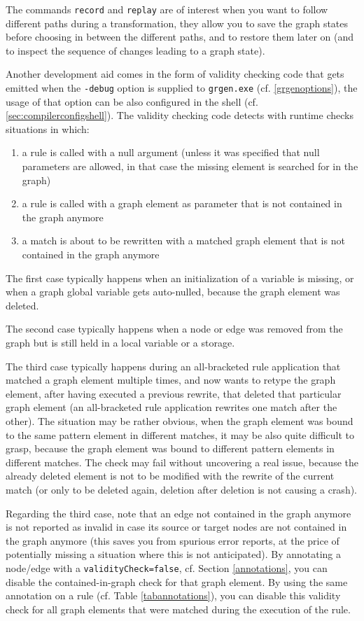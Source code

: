 The commands \verb#record# and \verb#replay# are of interest when you want to follow different paths during a transformation, they allow you to save the graph states before choosing in between the different paths, and to restore them later on (and to inspect the sequence of changes leading to a graph state).

Another development aid comes in the form of validity checking code that gets emitted when the \texttt{-debug} option is supplied to \texttt{grgen.exe} (cf. \ref{grgenoptions}), the usage of that option can be also configured in the shell (cf. \ref{sec:compilerconfigshell}).
The validity checking code detects with runtime checks situations in which: 
\begin{enumerate}
	\item a rule is called with a null argument (unless it was specified that null parameters are allowed, in that case the missing element is searched for in the graph)
	\item a rule is called with a graph element as parameter that is not contained in the graph anymore
	\item a match is about to be rewritten with a matched graph element that is not contained in the graph anymore
\end{enumerate}

The first case typically happens when an initialization of a variable is missing, or when a graph global variable gets auto-nulled, because the graph element was deleted. 

The second case typically happens when a node or edge was removed from the graph but is still held in a local variable or a storage. 

The third case typically happens during an all-bracketed rule application that matched a graph element multiple times, and now wants to retype the graph element, after having executed a previous rewrite, that deleted that particular graph element (an all-bracketed rule application rewrites one match after the other). 
The situation may be rather obvious, when the graph element was bound to the same pattern element in different matches, it may be also quite difficult to grasp, because the graph element was bound to different pattern elements in different matches.
The check may fail without uncovering a real issue, because the already deleted element is not to be modified with the rewrite of the current match (or only to be deleted again, deletion after deletion is not causing a crash).

Regarding the third case, note that an edge not contained in the graph anymore is not reported as invalid in case its source or target nodes are not contained in the graph anymore (this saves you from spurious error reports, at the price of potentially missing a situation where this is not anticipated).
By annotating a node/edge with a \texttt{validityCheck=false}, cf. Section \ref{annotations}, you can disable the contained-in-graph check for that graph element.
By using the same annotation on a rule (cf. Table \ref{tabannotations}), you can disable this validity check for all graph elements that were matched during the execution of the rule.


